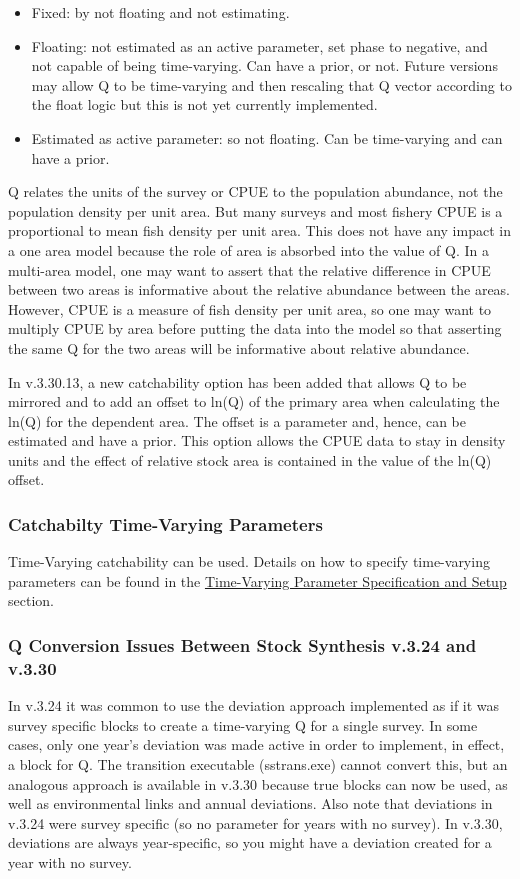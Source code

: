 \begin{itemize}
	\item Fixed: by not floating and not estimating.

	\item Floating: not estimated as an active parameter, set phase to negative, and not capable of being time-varying. Can have a prior, or not. Future versions may allow Q to be time-varying and then rescaling that Q vector according to the float logic but this is not yet currently implemented.

	\item Estimated as active parameter: so not floating. Can be time-varying and can have a prior.
\end{itemize}


Q relates the units of the survey or CPUE to the population abundance, not the population density per unit area. But many surveys and most fishery CPUE is a proportional to mean fish density per unit area. This does not have any impact in a one area model because the role of area is absorbed into the value of Q. In a multi-area model, one may want to assert that the relative difference in CPUE between two areas is informative about the relative abundance between the areas. However, CPUE is a measure of fish density per unit area, so one may want to multiply CPUE by area before putting the data into the model so that asserting the same Q for the two areas will be informative about relative abundance.

In v.3.30.13, a new catchability option has been added that allows Q to be mirrored and to add an offset to ln(Q) of the primary area when calculating the ln(Q) for the dependent area. The offset is a parameter and, hence, can be estimated and have a prior. This option allows the CPUE data to stay in density units and the effect of relative stock area is contained in the value of the ln(Q) offset.

\subsubsection{Catchabilty Time-Varying Parameters}
Time-Varying catchability can be used. Details on how to specify time-varying parameters can be found in the \hyperlink{tvOrder}{Time-Varying Parameter Specification and Setup} section.

\subsubsection{Q Conversion Issues Between Stock Synthesis v.3.24 and v.3.30}
In v.3.24 it was common to use the deviation approach implemented as if it was survey specific blocks to create a time-varying Q for a single survey. In some cases, only one year's deviation was made active in order to implement, in effect, a block for Q. The transition executable (sstrans.exe) cannot convert this, but an analogous approach is available in v.3.30 because true blocks can now be used, as well as environmental links and annual deviations. Also note that deviations in v.3.24 were survey specific (so no parameter for years with no survey). In v.3.30, deviations are always year-specific, so you might have a deviation created for a year with no survey.

